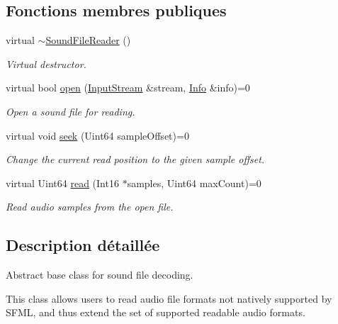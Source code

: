 \subsection*{Fonctions membres publiques}
\begin{DoxyCompactItemize}
\item 
\mbox{\label{classsf_1_1SoundFileReader_a34163297f302d15818c76b54f815acc8}} 
virtual \hyperlink{classsf_1_1SoundFileReader_a34163297f302d15818c76b54f815acc8}{$\sim$\+Sound\+File\+Reader} ()
\begin{DoxyCompactList}\small\item\em Virtual destructor. \end{DoxyCompactList}\item 
virtual bool \hyperlink{classsf_1_1SoundFileReader_aa1d2fee2ba8f359c833ab74590d55935}{open} (\hyperlink{classsf_1_1InputStream}{Input\+Stream} \&stream, \hyperlink{structsf_1_1SoundFileReader_1_1Info}{Info} \&info)=0
\begin{DoxyCompactList}\small\item\em Open a sound file for reading. \end{DoxyCompactList}\item 
virtual void \hyperlink{classsf_1_1SoundFileReader_a1e18ade5ffe882bdfa20a2ebe7e2b015}{seek} (Uint64 sample\+Offset)=0
\begin{DoxyCompactList}\small\item\em Change the current read position to the given sample offset. \end{DoxyCompactList}\item 
virtual Uint64 \hyperlink{classsf_1_1SoundFileReader_a3b7d86769ea07e24e7b0f0486bed7591}{read} (Int16 $\ast$samples, Uint64 max\+Count)=0
\begin{DoxyCompactList}\small\item\em Read audio samples from the open file. \end{DoxyCompactList}\end{DoxyCompactItemize}


\subsection{Description détaillée}
Abstract base class for sound file decoding. 

This class allows users to read audio file formats not natively supported by S\+F\+ML, and thus extend the set of supported readable audio formats.

